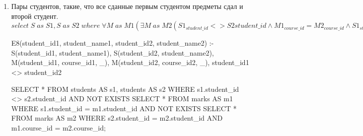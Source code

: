 \documentclass[10pt, a4paper]{article}
\begin{document}
\begin{enumerate}
	\item {Пары студентов, такие, что все сданные первым студентом предметы сдал и второй студент.\\
	$select \; S \; as \; S1, S \; as \; S2 \; where \; \forall M \; as \; M1 (\exists M \; as \; M2 (S1_{student\_id} <> S2{student\_id} \wedge M1_{course\_id} = M2_{course\_id} \wedge S1_{student\_id} = M1_{student\_id} \wedge S2_{student\_id} = M2_{student\_id}))$

	\begin{prolog}
E8(student_id1, student_name1, student_id2, student_name2) :- S(student_id1, student_name1), S(student_id2, student_name2),
	M(student_id1, course_id1, _), M(student_id2, course_id2, _),
	student_id1 <> student_id2
	\end{prolog}

	\begin{sql}
SELECT * FROM students AS s1, students AS s2
WHERE s1.student_id <> s2.student_id AND
	NOT EXISTS
	SELECT * FROM marks AS m1
	WHERE s1.student_id = m1.student_id AND
		NOT EXISTS
		SELECT * FROM marks AS m2
		WHERE s2.student_id = m2.student_id AND
			m1.course_id = m2.course_id;
	\end{sql}
	}

\end{enumerate}
\end{document}
